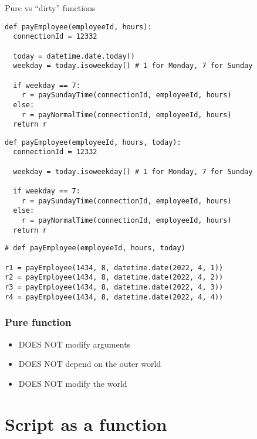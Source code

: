 \documentclass[aspectratio=169]{beamer}
\begin{document}
\begin{frame}
\centering
\Huge
Pure vs ``dirty'' functions
\end{frame}

\begin{frame}[fragile]
\begin{lstlisting}
def payEmployee(employeeId, hours):
  connectionId = 12332

  today = datetime.date.today()
  weekday = today.isoweekday() # 1 for Monday, 7 for Sunday

  if weekday == 7:
    r = paySundayTime(connectionId, employeeId, hours)
  else:
    r = payNormalTime(connectionId, employeeId, hours)
  return r
\end{lstlisting}
\end{frame}

\begin{frame}[fragile]
\begin{lstlisting}
def payEmployee(employeeId, hours, today):
  connectionId = 12332

  weekday = today.isoweekday() # 1 for Monday, 7 for Sunday

  if weekday == 7:
    r = paySundayTime(connectionId, employeeId, hours)
  else:
    r = payNormalTime(connectionId, employeeId, hours)
  return r
\end{lstlisting}
\end{frame}

\begin{frame}[fragile]
\begin{lstlisting}
# def payEmployee(employeeId, hours, today)

r1 = payEmployee(1434, 8, datetime.date(2022, 4, 1))
r2 = payEmployee(1434, 8, datetime.date(2022, 4, 2))
r3 = payEmployee(1434, 8, datetime.date(2022, 4, 3))
r4 = payEmployee(1434, 8, datetime.date(2022, 4, 4))
\end{lstlisting}
\end{frame}

\begin{frame}[fragile]
\frametitle{Pure function}
\begin{itemize}
  \item DOES NOT modify arguments
  \pause
  \item DOES NOT depend on the outer world
  \pause
  \item DOES NOT modify the world
\end{itemize}
\end{frame}

\section{Script as a function}
\end{document}
